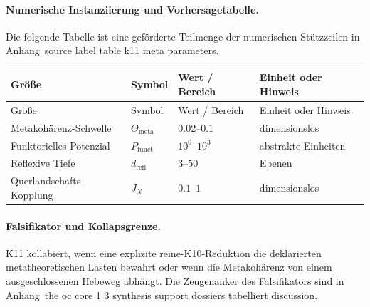 \paragraph{Numerische Instanziierung und Vorhersagetabelle.}
Die folgende Tabelle ist eine geförderte Teilmenge der numerischen Stützzeilen in Anhang~source label table k11 meta parameters.
\begin{longtable}{@{}L{0.27\textwidth}L{0.15\textwidth}L{0.24\textwidth}L{0.16\textwidth}@{}}
\toprule
Größe & Symbol & Wert / Bereich & Einheit oder Hinweis \\
\midrule
\endfirsthead
\toprule
Größe & Symbol & Wert / Bereich & Einheit oder Hinweis \\
\midrule
\endhead
Metakohärenz-Schwelle & $\scriptstyle \Theta_{\mathrm{meta}}$ & $0.02\text{--}0.1$ & dimensionslos \\
Funktorielles Potenzial & $\scriptstyle P_{\mathrm{funct}}$ & $10^0\text{--}10^3$ & abstrakte Einheiten \\
Reflexive Tiefe & $\scriptstyle d_{\mathrm{refl}}$ & $3\text{--}50$ & Ebenen \\
Querlandschafts-Kopplung & $\scriptstyle J_X$ & $0.1\text{--}1$ & dimensionslos \\
\bottomrule
\end{longtable}

\paragraph{Falsifikator und Kollapsgrenze.}
K11 kollabiert, wenn eine explizite reine-K10-Reduktion die deklarierten metatheoretischen Lasten bewahrt oder wenn die Metakohärenz von einem ausgeschlossenen Hebeweg abhängt.
Die Zeugenanker des Falsifikators sind in Anhang~the oc core 1 3 synthesis support dossiers tabelliert discussion.

